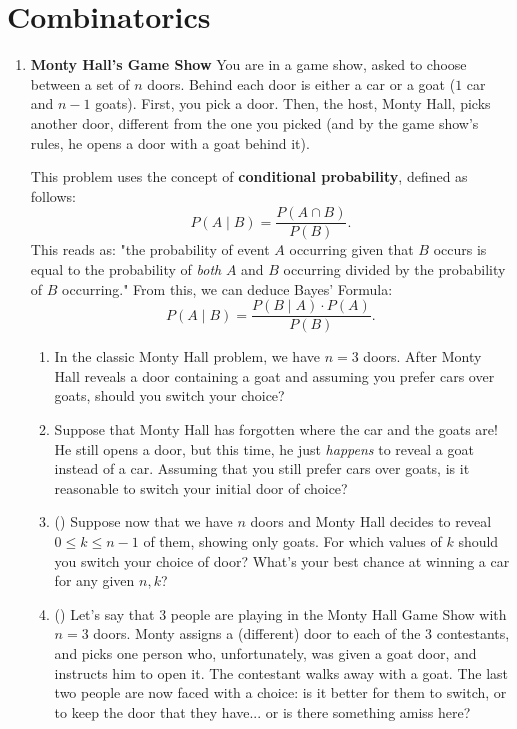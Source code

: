 \documentclass[11pt]{scrartcl}
\begin{document}
\section{Combinatorics}
\begin{enumerate}[label=\textbf{C\arabic*}.]
    \item \textbf{Monty Hall's Game Show} \newline
    You are in a game show, asked to choose between a set of $n$ doors. Behind each door is either a car or a goat ($1$ car and $n-1$ goats). First, you pick a door. Then, the host, Monty Hall, picks another door, different from the one you picked (and by the game show's rules, he opens a door with a goat behind it).
    
    \begin{theorem}
        This problem uses the concept of \textbf{conditional probability}, defined as follows:
        \[ P(A \mid B) = \frac{P(A \cap B)}{P(B)}. \]
        This reads as: "the probability of event $A$ occurring given that $B$ occurs is equal to the probability of \textit{both} $A$ and $B$ occurring divided by the probability of $B$ occurring." From this, we can deduce Bayes' Formula:
        \[ P(A \mid B) = \frac{P(B \mid A) \cdot P(A)}{P(B)}. \]
    \end{theorem}
    
    \begin{enumerate}
        \item In the classic Monty Hall problem, we have $n = 3$ doors. After Monty Hall reveals a door containing a goat and assuming you prefer cars over goats, should you switch your choice?
        
        \item Suppose that Monty Hall has forgotten where the car and the goats are! He still opens a door, but this time, he just \textit{happens} to reveal a goat instead of a car. Assuming that you still prefer cars over goats, is it reasonable to switch your initial door of choice?
        
        \item (\halfchili) Suppose now that we have $n$ doors and Monty Hall decides to reveal $0 \leq k \leq n-1$ of them, showing only goats. For which values of $k$ should you switch your choice of door? What's your best chance at winning a car for any given $n, k$?
        
        \item (\halfchili) Let's say that $3$ people are playing in the Monty Hall Game Show with $n = 3$ doors. Monty assigns a (different) door to each of the $3$ contestants, and picks one person who, unfortunately, was given a goat door, and instructs him to open it. The contestant walks away with a goat. The last two people are now faced with a choice: is it better for them to switch, or to keep the door that they have... or is there something amiss here?
    \end{enumerate}
    

\end{enumerate}
\end{document}
